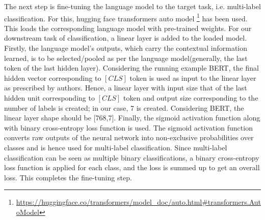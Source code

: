 The next step is fine-tuning the language model to the target task, i.e. multi-label classification. For this, hugging face transformers auto model \footnote{\url{https://huggingface.co/transformers/model_doc/auto.html#transformers.AutoModel}} has been used. This loads the corresponding language model with pre-trained weights. For our downstream task of classification, a linear layer is added to the loaded model. Firstly, the language model's outputs, which carry the contextual information learned, is to be selected/pooled as per the language model(generally, the last token of the last hidden layer). Considering the running example BERT, the final hidden vector corresponding to $[CLS]$ token is used as input to the linear layer as prescribed by authors\cite{devlin2018bert}. Hence, a linear layer with input size that of the last hidden unit corresponding to $[CLS]$ token and output size corresponding to the number of labels is created; in our case, 7 is created. Considering BERT, the linear layer shape should be [768,7].  Finally, the sigmoid activation function along with binary cross-entropy loss function is used. The sigmoid activation function converts raw outputs of the neural network into non-exclusive probabilities over classes and is hence used for multi-label classification. Since multi-label classification can be seen as multiple binary classifications, a binary cross-entropy loss function is applied for each class, and the loss is summed up to get an overall loss. This completes the fine-tuning step.

